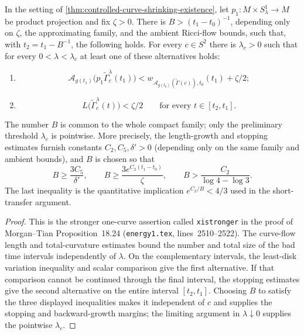 \begin{lemma}
\label{lem:single-ramp-terminal-dichotomy}
\notready
In the setting of
\ref{thm:controlled-curve-shrinking-existence}, let
$p_1\colon M\times S^1_\lambda\to M$ be product projection and fix
$\zeta>0$.  There is
$B>(t_1-t_0)^{-1}$, depending only on $\zeta$, the approximating family, and
the ambient Ricci-flow bounds, such that, with $t_2=t_1-B^{-1}$, the following
holds.  For every $c\in S^2$ there is $\lambda_c>0$ such that for every
$0<\lambda<\lambda_c$ at least one of these alternatives holds:
\begin{enumerate}
\item
\[
 \mathcal A_{g(t_1)}
   \bigl(p_1\widetilde\Gamma_c^\lambda(t_1)\bigr)
 <w_{\mathcal A_{g(t_0)}(\widetilde\Gamma(c)),t_0}(t_1)+\zeta/2;
\]
\item
\[
 L\bigl(\widetilde\Gamma_c^\lambda(t)\bigr)<\zeta/2
 \qquad\text{for every }t\in[t_2,t_1].
\]
\end{enumerate}
The number $B$ is common to the whole compact family; only the preliminary
threshold $\lambda_c$ is pointwise.  More precisely, the length-growth and
stopping estimates furnish constants $C_2,C_5,\delta'>0$ (depending only on
the same family and ambient bounds), and $B$ is chosen so that
\[
 B\ge \frac{3C_5}{\delta'},\qquad
 B\ge \frac{3e^{C_2(t_1-t_0)}}{\zeta},\qquad
 B>\frac{C_2}{\log 4-\log 3}.
\]
The last inequality is the quantitative implication
$e^{C_2/B}<4/3$ used in the short-transfer argument.
\end{lemma}

\begin{proof}
This is the stronger one-curve assertion called
\texttt{xistronger} in the proof of Morgan--Tian Proposition~18.24
(\texttt{energy1.tex}, lines~2510--2522).  The curve-flow length and
total-curvature estimates bound the number and total size of the bad time
intervals independently of $\lambda$.  On the complementary intervals,
the least-disk variation inequality and scalar comparison give the first
alternative.  If that comparison cannot be continued through the final
interval, the stopping estimates give the second alternative on the entire
interval $[t_2,t_1]$.  Choosing $B$ to satisfy the three displayed
inequalities makes it independent of $c$ and supplies the stopping and
backward-growth margins; the limiting argument in $\lambda\downarrow0$ supplies
the pointwise $\lambda_c$.
\end{proof}

